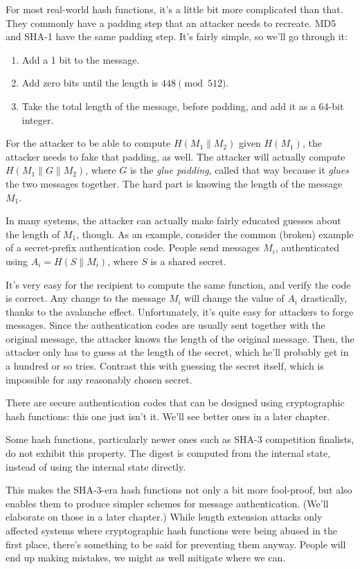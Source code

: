 \documentclass[11pt,ebook,table,dvipsnames]{memoir}
\begin{document}
For most real-world hash functions, it's a little bit more complicated
than that. They commonly have a padding step that an attacker needs to
recreate. MD5 and SHA-1 have the same padding step. It's fairly
simple, so we'll go through it:

\begin{enumerate}
\item Add a 1 bit to the message.
\item Add zero bits until the length is $448 \pmod {512}$.
\item Take the total length of the message, before padding, and add it
as a 64-bit integer.
\end{enumerate}

For the attacker to be able to compute $H(M_1 \| M_2)$ given
$H(M_1)$, the attacker needs to fake that padding, as well. The
attacker will actually compute $H(M_1 \| G \| M_2)$, where $G$ is the
\emph{glue padding}, called that way because it \emph{glues} the two messages
together. The hard part is knowing the length of the message $M_1$.

In many systems, the attacker can actually make fairly educated
guesses about the length of $M_1$, though. As an example, consider
the common (broken) example of a secret-prefix authentication code.
People send messages $M_i$, authenticated using $A_i = H(S \| M_i)$,
where $S$ is a shared secret.

It's very easy for the recipient to compute the same function, and
verify the code is correct. Any change to the message $M_i$ will
change the value of $A_i$ drastically, thanks to the avalanche effect.
Unfortunately, it's quite easy for attackers to forge messages. Since
the authentication codes are usually sent together with the original
message, the attacker knows the length of the original message. Then,
the attacker only has to guess at the length of the secret, which
he'll probably get in a hundred or so tries. Contrast this with
guessing the secret itself, which is impossible for any reasonably
chosen secret.

There are secure authentication codes that can be designed using
cryptographic hash functions: this one just isn't it. We'll see
better ones in a later chapter.

Some hash functions, particularly newer ones such as SHA-3 competition
finalists, do not exhibit this property. The digest is computed from
the internal state, instead of using the internal state directly.

This makes the SHA-3-era hash functions not only a bit more
fool-proof, but also enables them to produce simpler schemes for
message authentication. (We'll elaborate on those in a later chapter.)
While length extension attacks only affected systems where
cryptographic hash functions were being abused in the first place,
there's something to be said for preventing them anyway. People will
end up making mistakes, we might as well mitigate where we can.
\end{document}
